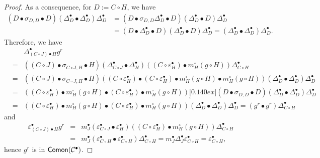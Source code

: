 \documentclass[nosumlimits,twoside]{amsart}
\theoremstyle{definition}
\theoremstyle{remark}
\newcommand{\Cc}{\mathcal{C}}
\def\Comon{{\sf Comon}}
\begin{document}
\begin{proof}
As a consequence, for $D:=C\circ H$, we have
\begin{align*}
\left( D \bullet \sigma _{D,D}\bullet
D\right) \left( \Delta _{D}^{\bullet }\bullet \Delta _{D}^{\bullet }\right) \Delta _{D}^{\bullet }
&=
\left( D \bullet \sigma _{D,D}\Delta _{D}^{\bullet }\bullet
D\right) \left( \Delta _{D}^{\bullet }\bullet D\right) \Delta _{D}^{\bullet }\\
&=
\left( D \bullet \Delta _{D}^{\bullet }\bullet
D\right) \left( \Delta _{D}^{\bullet }\bullet D\right) \Delta _{D}^{\bullet }
=
\left( \Delta _{D}^{\bullet }\bullet \Delta _{D}^{\bullet }\right) \Delta _{D}^{\bullet }.\end{align*}
Therefore, we have
\begin{eqnarray*}
&&\Delta _{\left( C\circ J\right) \bullet H}^{\bullet }g^{r} \\
&=&\left( \left(
C\circ J\right) \bullet \sigma _{C\circ J,H}\bullet H\right) \left( \Delta
_{C\circ J}^{\bullet }\bullet \Delta _{H}^{\bullet }\right) \left( \left(
C\circ \varepsilon _{H}^{\bullet }\right) \bullet m_{H}^{\circ }\left(
g\circ H\right) \right) \Delta _{C\circ H}^{\bullet } \\
&=&\left( \left( C\circ J\right) \bullet \sigma _{C\circ J,H}\bullet
H\right) \left( \left( C\circ \varepsilon _{H}^{\bullet }\right) \bullet
\left( C\circ \varepsilon _{H}^{\bullet }\right) \bullet m_{H}^{\circ
}\left( g\circ H\right) \bullet m_{H}^{\circ }\left( g\circ H\right) \right)
\left( \Delta _{D}^{\bullet }\bullet \Delta _{D}^{\bullet
}\right) \Delta _{D}^{\bullet } \\
&=&\left( \left( C\circ \varepsilon _{H}^{\bullet }\right) \bullet
m_{H}^{\circ }\left( g\circ H\right) \bullet \left( C\circ \varepsilon
_{H}^{\bullet }\right) \bullet m_{H}^{\circ }\left( g\circ H\right) \right)
\underbracket[0.140ex]{\left(D \bullet \sigma _{D,D}\bullet
D\right) \left( \Delta _{D}^{\bullet }\bullet \Delta _{D}^{\bullet }\right) \Delta _{D}^{\bullet }} \\
&=&\left( \left( C\circ \varepsilon _{H}^{\bullet }\right) \bullet
m_{H}^{\circ }\left( g\circ H\right) \bullet \left( C\circ \varepsilon
_{H}^{\bullet }\right) \bullet m_{H}^{\circ }\left( g\circ H\right) \right)
\left( \Delta _{D}^{\bullet }\bullet \Delta _{D}^{\bullet
}\right) \Delta _{D}^{\bullet }
=\left( g^{r}\bullet g^{r}\right) \Delta _{C\circ H}^{\bullet }
\end{eqnarray*}%
and%
\begin{eqnarray*}
\varepsilon _{\left( C\circ J\right) \bullet H}^{\bullet }g^{r}
&=&m_{J}^{\bullet }\left( \varepsilon _{C\circ J}^{\bullet }\bullet
\varepsilon _{H}^{\bullet }\right) \left( \left( C\circ \varepsilon
_{H}^{\bullet }\right) \bullet m_{H}^{\circ }\left( g\circ H\right) \right)
\Delta _{C\circ H}^{\bullet } \\
&=&m_{J}^{\bullet }\left( \varepsilon _{C\circ H}^{\bullet }\bullet
\varepsilon _{C\circ H}^{\bullet }\right) \Delta _{C\circ H}^{\bullet
}=m_{J}^{\bullet }\Delta _{J}^{\bullet }\varepsilon _{C\circ H}^{\bullet
}=\varepsilon _{C\circ H}^{\bullet },
\end{eqnarray*}
hence $g^r$ is in $\Comon(\Cc^{\bullet})$.
\end{proof}
\end{document}
